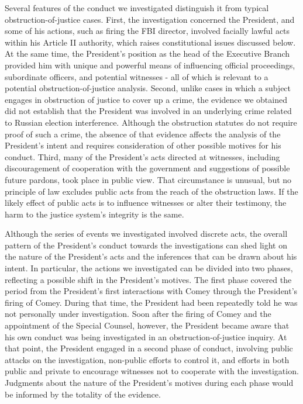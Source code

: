 Several features of the conduct we investigated distinguish it from typical obstruction-of-justice cases.
First, the investigation concerned the President, and some of his actions, such as firing the FBI director, involved facially lawful acts within his Article II authority, which raises constitutional issues discussed below.
At the same time, the President’s position as the head of the Executive Branch provided him with unique and powerful means of influencing official proceedings, subordinate officers, and potential witnesses - all of which is relevant to a potential obstruction-of-justice analysis.
Second, unlike cases in which a subject engages in obstruction of justice to cover up a crime, the evidence we obtained did not establish that the President was involved in an underlying crime related to Russian election interference.
Although the obstruction statutes do not require proof of such a crime, the absence of that evidence affects the analysis of the President’s intent and requires consideration of other possible motives for his conduct.
Third, many of the President’s acts directed at witnesses, including discouragement of cooperation with the government and suggestions of possible future pardons, took place in public view.
That circumstance is unusual, but no principle of law excludes public acts from the reach of the obstruction laws.
If the likely effect of public acts is to influence witnesses or alter their testimony, the harm to the justice system’s integrity is the same.

Although the series of events we investigated involved discrete acts, the overall pattern of the President’s conduct towards the investigations can shed light on the nature of the President’s acts and the inferences that can be drawn about his intent.
In particular, the actions we investigated can be divided into two phases, reflecting a possible shift in the President’s motives.
The first phase covered the period from the President’s first interactions with Comey through the President’s firing of Comey.
During that time, the President had been repeatedly told he was not personally under investigation.
Soon after the firing of Comey and the appointment of the Special Counsel, however, the President became aware that his own conduct was being investigated in an obstruction-of-justice inquiry.
At that point, the President engaged in a second phase of conduct, involving public attacks on the investigation, non-public efforts to control it, and efforts in both public and private to encourage witnesses not to cooperate with the investigation.
Judgments about the nature of the President’s motives during each phase would be informed by the totality of the evidence.

